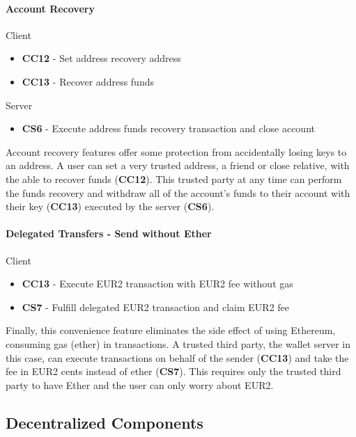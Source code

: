 \documentclass[12pt]{article} %
\begin{document}
{{\paragraph{Account Recovery}

Client
\begin{itemize}
	\item \textbf{CC12} - Set address recovery address
	\item \textbf{CC13} - Recover address funds
\end{itemize}

Server
\begin{itemize}
	\item \textbf{CS6} - Execute address funds recovery transaction and close account
\end{itemize}

Account recovery features offer some protection from accidentally losing keys to an address. A user can set a very trusted address, a friend or close relative, with the able to recover funds (\textbf{CC12}). This trusted party at any time can perform the funds recovery and withdraw all of the account's funds to their account with their key (\textbf{CC13}) executed by the server (\textbf{CS6}).

\paragraph{Delegated Transfers - Send without Ether}

Client
\begin{itemize}
	\item \textbf{CC13} - Execute EUR2 transaction with EUR2 fee without gas
\end{itemize}

\begin{itemize}
	\item \textbf{CS7} - Fulfill delegated EUR2 transaction and claim EUR2 fee
\end{itemize}

Finally, this convenience feature eliminates the side effect of using Ethereum, consuming gas (ether) in transactions. A trusted third party, the wallet server in this case, can execute transactions on behalf of the sender (\textbf{CC13}) and take the fee in EUR2 cents instead of ether (\textbf{CS7}). This requires only the trusted third party to have Ether and the user can only worry about EUR2.

\subsection{Decentralized Components} \label{ssec:3.4}

}}
\end{document}
